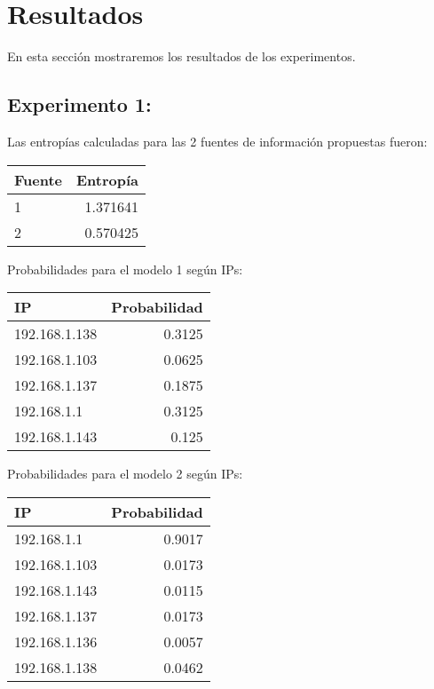 \section{Resultados}
En esta sección mostraremos los resultados de los experimentos.

\subsection{Experimento 1:}

Las entropías calculadas para las 2 fuentes de información propuestas fueron:

\begin{center}
\begin{tabular}{ l r }
   Fuente& Entropía  \\
\hline
   1 & 1.371641 \\
   2 & 0.570425 \\
 \end{tabular}
\label{entropiashogar}
\end{center}

Probabilidades para el modelo 1 según IPs:

\begin{center}
\begin{tabular}{ l r }
   IP &Probabilidad \\
\hline
192.168.1.138	& 0.3125 \\
192.168.1.103	& 0.0625 \\
192.168.1.137	& 0.1875 \\
192.168.1.1		& 0.3125 \\
192.168.1.143	& 0.125 \\
 \end{tabular}
\label{probabilidadesModel1}
\end{center}

Probabilidades para el modelo 2 según IPs:
\begin{center}
\begin{tabular}{ l r }
   IP &Probabilidad \\
\hline
192.168.1.1		& 0.9017 \\
192.168.1.103	& 0.0173 \\
192.168.1.143 	& 0.0115 \\
192.168.1.137	& 0.0173 \\
192.168.1.136	& 0.0057 \\
192.168.1.138	& 0.0462 \\
 \end{tabular}
\label{probabilidadesModel2}
\end{center}

